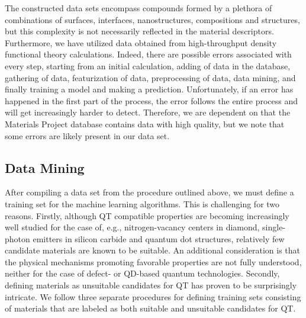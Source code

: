 \documentclass[superscriptaddress,unsortedaddress,
 amsmath,amssymb,
 aps,
]{revtex4-2}
\begin{document}
The constructed data sets encompass compounds formed by a plethora of combinations of surfaces, interfaces, nanostructures, compositions and structures, but this complexity is not necessarily reflected in the material descriptors. 
Furthermore, we have utilized data obtained from high-throughput density functional theory calculations. Indeed, there are possible errors associated with every step, starting from an initial calculation, adding of data in the database, gathering of data, featurization of data, preprocessing of data, data mining, and finally training a model and making a prediction. Unfortunately, if an error has happened in the first part of the process, the error follows the entire process and will get increasingly harder to detect. Therefore, we are dependent on that the Materials Project database contains data with high quality, but we note that some errors are likely present in our data set. 

\subsection*{Data Mining}

After compiling a data set from the procedure outlined above, we must define a training set for the machine learning algorithms. This is challenging for two reasons.  
Firstly, although QT compatible properties are becoming increasingly well studied for the case of, e.g., nitrogen-vacancy centers in diamond, single-photon emitters in silicon carbide and quantum dot structures, relatively few candidate materials are known to be suitable. An additional consideration is that the physical mechanisms promoting favorable properties are not fully understood, neither for the case of defect- or QD-based quantum technologies. Secondly, defining materials as unsuitable candidates for QT has proven to be surprisingly intricate. 
We follow three separate procedures for defining training sets consisting of materials that are labeled as both suitable and unsuitable candidates for QT. 
\end{document}
